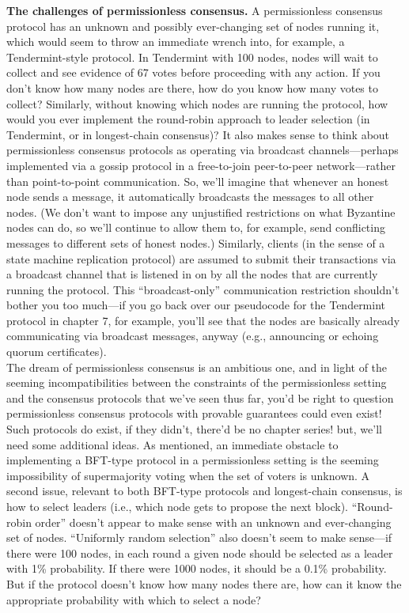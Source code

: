 \noindent
\textbf{The challenges of permissionless consensus.} A permissionless consensus protocol has
an unknown and possibly ever-changing set of nodes running it, which would seem to throw
an immediate wrench into, for example, a Tendermint-style protocol. In Tendermint with
100 nodes, nodes will wait to collect and see evidence of 67 votes before proceeding with
any action. If you don’t know how many nodes are there, how do you know how many
votes to collect? Similarly, without knowing which nodes are running the protocol, how
would you ever implement the round-robin approach to leader selection (in Tendermint, or
in longest-chain consensus)?
It also makes sense to think about permissionless consensus protocols as operating via
broadcast channels—perhaps implemented via a gossip protocol in a free-to-join peer-to-peer
network—rather than point-to-point communication. So, we’ll imagine that whenever an
honest node sends a message, it automatically broadcasts the messages to all other nodes.
(We don’t want to impose any unjustified restrictions on what Byzantine nodes can do,
so we’ll continue to allow them to, for example, send conflicting messages to different sets of honest nodes.) Similarly, clients (in the sense of a state machine replication protocol) are assumed to submit their transactions via a broadcast channel that is listened in on by
all the nodes that are currently running the protocol. This “broadcast-only” communication restriction shouldn't bother you too much—if you go back over our pseudocode for the
Tendermint protocol in chapter 7, for example, you’ll see that the nodes are basically already communicating via broadcast messages, anyway (e.g., announcing or echoing quorum
certificates).\\
The dream of permissionless consensus is an ambitious one, and in light of the seeming
incompatibilities between the constraints of the permissionless setting and the consensus protocols that we've seen thus far, you’d be right to question permissionless consensus protocols
with provable guarantees could even exist!\\
Such protocols do exist, if they didn’t, there’d be no chapter series! but, we’ll need some
additional ideas. As mentioned, an immediate obstacle to implementing a BFT-type protocol
in a permissionless setting is the seeming impossibility of supermajority voting when the set
of voters is unknown. A second issue, relevant to both BFT-type protocols and longest-chain consensus, is how to select leaders (i.e., which node gets to propose the next block).
“Round-robin order” doesn't appear to make sense with an unknown and ever-changing set
of nodes. “Uniformly random selection” also doesn't seem to make sense—if there were 100
nodes, in each round a given node should be selected as a leader with 1\% probability. If there were 1000 nodes, it should be a 0.1\% probability. But if the protocol doesn't know how many nodes there are, how can it know the appropriate probability with which to select a node?

